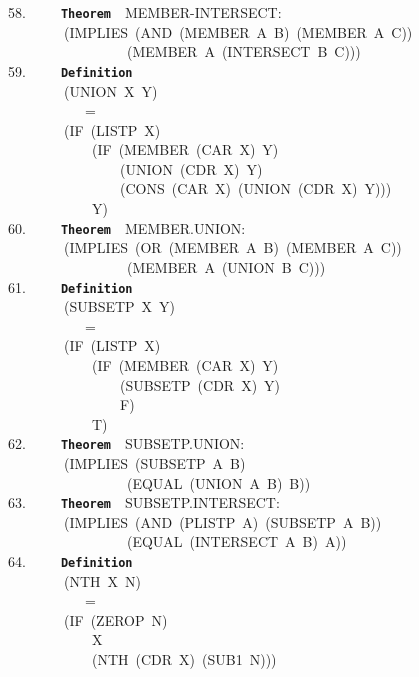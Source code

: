 \documentclass[11pt]{book}
\newenvironment{pubasis}{\begin{flushleft}\ttfamily\small}{\normalsize\rmfamily\end{flushleft}}
\newcommand{\axiomordefinition}[1]{\vspace{6pt}\texttt{\textbf{#1}}}
\begin{document}
\begin{pubasis}
58.~~~~~\axiomordefinition{Theorem}~~MEMBER-INTERSECT:\\
~~~~~~~~(IMPLIES~(AND~(MEMBER~A~B)~(MEMBER~A~C))\\
~~~~~~~~~~~~~~~~~(MEMBER~A~(INTERSECT~B~C)))\\

59.~~~~~\axiomordefinition{Definition}\\
~~~~~~~~(UNION~X~Y)\\
~~~~~~~~~~~=\\
~~~~~~~~(IF~(LISTP~X)\\
~~~~~~~~~~~~(IF~(MEMBER~(CAR~X)~Y)\\
~~~~~~~~~~~~~~~~(UNION~(CDR~X)~Y)\\
~~~~~~~~~~~~~~~~(CONS~(CAR~X)~(UNION~(CDR~X)~Y)))\\
~~~~~~~~~~~~Y)\\

60.~~~~~\axiomordefinition{Theorem}~~MEMBER.UNION:\\
~~~~~~~~(IMPLIES~(OR~(MEMBER~A~B)~(MEMBER~A~C))\\
~~~~~~~~~~~~~~~~~(MEMBER~A~(UNION~B~C)))\\

61.~~~~~\axiomordefinition{Definition}\\
~~~~~~~~(SUBSETP~X~Y)\\
~~~~~~~~~~~=\\
~~~~~~~~(IF~(LISTP~X)\\
~~~~~~~~~~~~(IF~(MEMBER~(CAR~X)~Y)\\
~~~~~~~~~~~~~~~~(SUBSETP~(CDR~X)~Y)\\
~~~~~~~~~~~~~~~~F)\\
~~~~~~~~~~~~T)\\

62.~~~~~\axiomordefinition{Theorem}~~SUBSETP.UNION:\\
~~~~~~~~(IMPLIES~(SUBSETP~A~B)\\
~~~~~~~~~~~~~~~~~(EQUAL~(UNION~A~B)~B))\\

63.~~~~~\axiomordefinition{Theorem}~~SUBSETP.INTERSECT:\\
~~~~~~~~(IMPLIES~(AND~(PLISTP~A)~(SUBSETP~A~B))\\
~~~~~~~~~~~~~~~~~(EQUAL~(INTERSECT~A~B)~A))\\

64.~~~~~\axiomordefinition{Definition}\\
~~~~~~~~(NTH~X~N)\\
~~~~~~~~~~~=\\
~~~~~~~~(IF~(ZEROP~N)\\
~~~~~~~~~~~~X\\
~~~~~~~~~~~~(NTH~(CDR~X)~(SUB1~N)))\\


\end{pubasis}
\end{document}
